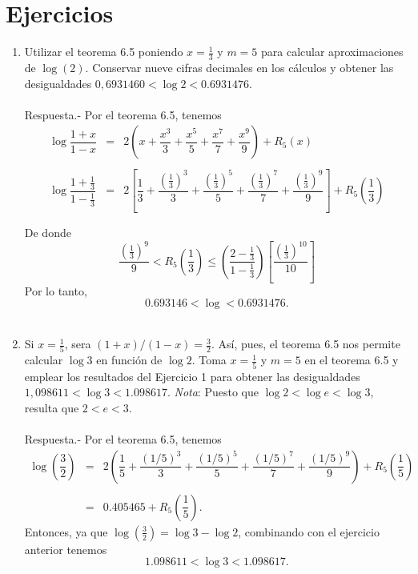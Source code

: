 \section{Ejercicios}
\begin{enumerate}[1.]

    \item Utilizar el teorema 6.5 poniendo $x=\frac{1}{3}$ y $m=5$ para calcular aproximaciones de $\log(2)$. Conservar nueve cifras decimales en los cálculos y obtener las desigualdades $0,6931460<\log 2 < 0.6931476.$\\\\
	Respuesta.-\; Por el teorema 6.5, tenemos
	$$
	\begin{array}{rcl}
	    \log \dfrac{1+x}{1-x} &=& 2\left(x+\dfrac{x^3}{3}+\dfrac{x^5}{5}+\dfrac{x^7}{7}+\dfrac{x^9}{9}\right)+R_5(x)\\\\
	    \log \dfrac{1+\frac{1}{3}}{1-\frac{1}{3}} &=& 2\left[\dfrac{1}{3}+\dfrac{\left(\frac{1}{3}\right)^3}{3}+\dfrac{\left(\frac{1}{3}\right)^5}{5}+\dfrac{\left(\frac{1}{3}\right)^7}{7}+\dfrac{\left(\frac{1}{3}\right)^9}{9}\right]+R_5\left(\dfrac{1}{3}\right)\\\\
	\end{array}
	$$
	De donde
	$$\dfrac{\left(\frac{1}{3}\right)^9}{9}<R_5\left(\dfrac{1}{3}\right)\leq \left(\dfrac{2-\frac{1}{3}}{1-\frac{1}{3}}\right) \left[\dfrac{\left(\frac{1}{3}\right)^{10}}{10}\right]$$
	Por lo tanto,
	$$0.693146<\log < 0.6931476.$$\\

    \item Si $x=\frac{1}{5}$, sera $(1+x)/(1-x)=\frac{3}{2}$. Así, pues, el teorema 6.5 nos permite calcular $\log 3$ en función de $\log 2$. Toma $x=\frac{1}{5}$ y $m=5$ en el teorema 6.5 y emplear los resultados del Ejercicio 1 para obtener las desigualdades $1,098611<\log 3 < 1.098617.$ \textit{Nota}: Puesto que $\log 2 < \log e < \log 3$, resulta que $2<e<3.$\\\\
	Respuesta.-\; Por el teorema 6.5, tenemos
	$$
	\begin{array}{rcl}
	    \log\left(\dfrac{3}{2}\right) &=& 2\left(\dfrac{1}{5}+\dfrac{(1/5)^3}{3}+\dfrac{(1/5)^5}{5}+\dfrac{(1/5)^7}{7}+\dfrac{(1/5)^{9}}{9}\right)+R_5\left(\dfrac{1}{5}\right)\\\\
					  &=& 0.405465 + R_5\left(\dfrac{1}{5}\right).
	\end{array}
	$$
	Entonces, ya que $\log(\frac{3}{2})=\log 3 - \log 2$, combinando con el ejercicio anterior tenemos
	$$1.098611<\log 3 < 1.098617.$$\\


\end{enumerate}

